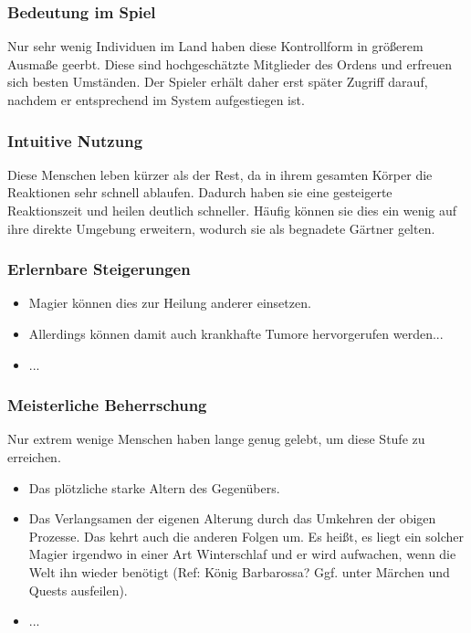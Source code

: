 \subsubsection{Bedeutung im Spiel}
Nur sehr wenig Individuen im Land haben diese Kontrollform in größerem Ausmaße geerbt. Diese sind hochgeschätzte Mitglieder des Ordens und erfreuen sich besten Umständen. Der Spieler erhält daher erst später Zugriff darauf, nachdem er entsprechend im System aufgestiegen ist.

\subsubsection{Intuitive Nutzung}
Diese Menschen leben kürzer als der Rest, da in ihrem gesamten Körper die Reaktionen sehr schnell ablaufen. Dadurch haben sie eine gesteigerte Reaktionszeit und heilen deutlich schneller. Häufig können sie dies ein wenig auf ihre direkte Umgebung erweitern, wodurch sie als begnadete Gärtner gelten.

\subsubsection{Erlernbare Steigerungen}
\begin{itemize}
	\item Magier können dies zur Heilung anderer einsetzen.
	\item Allerdings können damit auch krankhafte Tumore hervorgerufen werden... 
	\item ...
\end{itemize}

\subsubsection{Meisterliche Beherrschung} 
Nur extrem wenige Menschen haben lange genug gelebt, um diese Stufe zu erreichen.
\begin{itemize}
	\item Das plötzliche starke Altern des Gegenübers.
	\item Das Verlangsamen der eigenen Alterung durch das Umkehren der obigen Prozesse. Das kehrt auch die anderen Folgen um. Es heißt, es liegt ein solcher Magier irgendwo in einer Art Winterschlaf und er wird aufwachen, wenn die Welt ihn wieder benötigt (Ref: König Barbarossa? Ggf. unter Märchen und Quests ausfeilen). %
	\item ...
\end{itemize}



